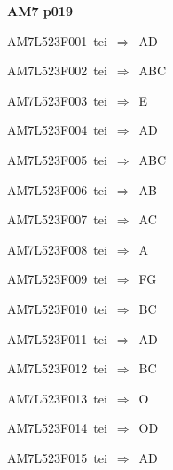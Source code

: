 \par\vfill\eject
{\bf\hfill AM7 p019\hfill\hbox{}}\par\bigskip
{\sixrm AM7L523F001\ {\sixit tei}\ }$\Rightarrow$\ AD\par\smallskip
{\sixrm AM7L523F002\ {\sixit tei}\ }$\Rightarrow$\ ABC\par\smallskip
{\sixrm AM7L523F003\ {\sixit tei}\ }$\Rightarrow$\ E\par\smallskip
{\sixrm AM7L523F004\ {\sixit tei}\ }$\Rightarrow$\ AD\par\smallskip
{\sixrm AM7L523F005\ {\sixit tei}\ }$\Rightarrow$\ ABC\par\smallskip
{\sixrm AM7L523F006\ {\sixit tei}\ }$\Rightarrow$\ AB\par\smallskip
{\sixrm AM7L523F007\ {\sixit tei}\ }$\Rightarrow$\ AC\par\smallskip
{\sixrm AM7L523F008\ {\sixit tei}\ }$\Rightarrow$\ A\par\smallskip
{\sixrm AM7L523F009\ {\sixit tei}\ }$\Rightarrow$\ FG\par\smallskip
{\sixrm AM7L523F010\ {\sixit tei}\ }$\Rightarrow$\ BC\par\smallskip
{\sixrm AM7L523F011\ {\sixit tei}\ }$\Rightarrow$\ AD\par\smallskip
{\sixrm AM7L523F012\ {\sixit tei}\ }$\Rightarrow$\ BC\par\smallskip
{\sixrm AM7L523F013\ {\sixit tei}\ }$\Rightarrow$\ O\par\smallskip
{\sixrm AM7L523F014\ {\sixit tei}\ }$\Rightarrow$\ OD\par\smallskip
{\sixrm AM7L523F015\ {\sixit tei}\ }$\Rightarrow$\ AD\par\smallskip


